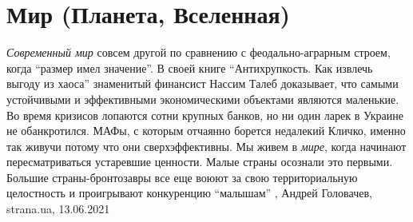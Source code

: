  
 
 
 
 
\chapter{Мир (Планета, Вселенная)}
\label{sec:slova.mir.world}

\emph{Современный мир} совсем другой по сравнению с феодально-аграрным строем, когда
\enquote{размер имел значение}. В своей книге \enquote{Антихрупкость. Как
извлечь выгоду из хаоса} знаменитый финансист Нассим Талеб доказывает, что
самыми устойчивыми и эффективными экономическими объектами являются маленькие.
Во время кризисов лопаются сотни крупных банков, но ни один ларек в Украине не
обанкротился.  МАФы, с которым отчаянно борется недалекий Кличко, именно так
живучи потому что они сверхэффективны.  Мы живем в \emph{мире}, когда начинают
пересматриваться устаревшие ценности. Малые страны осознали это первыми.
Большие страны-бронтозавры все еще воюют за свою территориальную целостность и
проигрывают конкуренцию \enquote{малышам}
, 
Андрей Головачев, strana.ua, 13.06.2021

